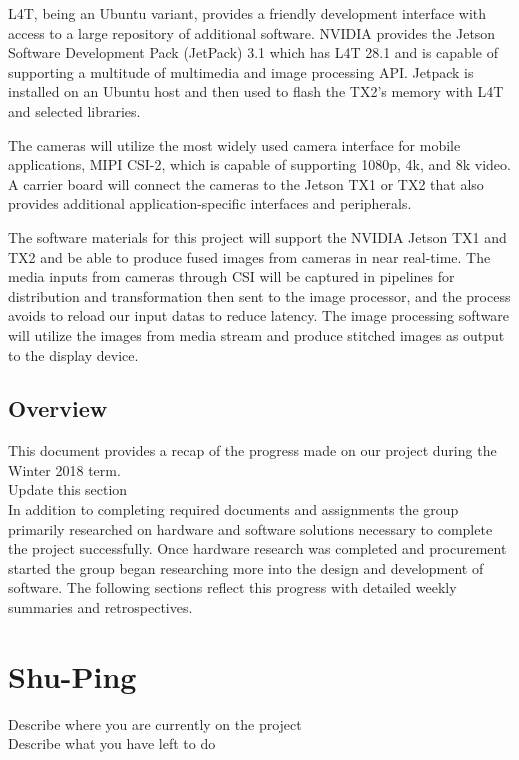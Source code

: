 \documentclass[letterpaper,10pt,serif,draftclsnofoot,onecolumn,compsoc,titlepage]{IEEEtran}
\begin{document}
L4T, being an Ubuntu variant, provides a friendly development interface with access to a large repository of additional software.
NVIDIA provides the Jetson Software Development Pack (JetPack) 3.1 which has L4T 28.1 
and is capable of supporting a multitude of multimedia and image processing API. Jetpack is installed on an Ubuntu host and then used to flash the TX2's memory with L4T and selected libraries.

The cameras will utilize the most widely used camera interface for mobile applications, 
MIPI CSI-2, which is capable of supporting 1080p, 4k, and 8k video. 
A carrier board will connect the cameras to the Jetson TX1 or TX2 that also provides 
additional application-specific interfaces and peripherals.

The software materials for this project will support the NVIDIA Jetson TX1 and TX2 and 
be able to produce fused images from cameras in near real-time. The media inputs from 
cameras through CSI will be captured in pipelines for distribution and transformation 
then sent to the image processor, and the process avoids to reload our input datas to 
reduce latency. The image processing software will utilize the images from media stream 
and produce stitched images as output to the display device.  \\

\subsection{Overview}
This document provides a recap of the progress made on our project during the 
Winter 2018 term. \\
Update this section \\
In addition to completing required documents and assignments the group primarily 
researched on hardware and software solutions necessary to complete the project 
successfully. Once hardware research was completed and procurement started the group 
began researching more into the design and development of software. The following 
sections reflect this progress with detailed weekly summaries and retrospectives. \\


\section{Shu-Ping}
Describe where you are currently on the project \\

Describe what you have left to do \\
\end{document}
